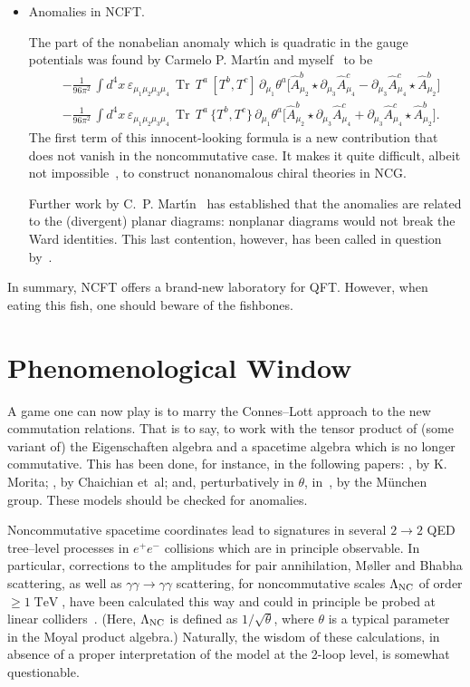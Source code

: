 \documentclass[a4paper,12pt]{article}
\newcommand{\Ahat}{\Hat{A}}
\newcommand{\del}{\partial}         %
\newcommand{\eps}{\varepsilon}      %
\newcommand{\ga}{\gamma}            %
\renewcommand{\Hat}[1]{\widehat{#1}}  %
\newcommand{\La}{\Lambda}           %
\DeclareMathOperator{\TeV}{TeV}     %
\DeclareMathOperator{\Tr}{Tr}       %
\newcommand{\1}{\mathbf{1}}         %
\newcommand{\7}{\dagger}            %
\newcommand{\8}{\bullet}            %
\renewcommand{\.}{\cdot}            %
\renewcommand{\:}{\colon}           %
\begin{document}
\begin{itemize}
\item  Anomalies in NCFT.

The part of the nonabelian anomaly which is quadratic in the gauge
potentials was found by Carmelo P. Mart\'{\i}n and
myself~\cite{Camilla} to be
\begin{align*}
&-\frac{1}{96\pi^2}\,\int d^4 x\,
\eps_{\mu_1\mu_2\mu_3\mu_4}\,\Tr\,T^a\,[T^b,T^c]\,
\del_{\mu_1} \theta^a \bigl[
\Ahat^b_{\mu_2} \star \del_{\mu_3} \Ahat^c_{\mu_4} -
\del_{\mu_3} \Ahat^c_{\mu_4} \star \Ahat^b_{\mu_2} \bigr]
\\
&-\frac{1}{96\pi^2}\,\int d^4 x\,
\eps_{\mu_1\mu_2\mu_3\mu_4}\,\Tr\,T^a\,\{T^b,T^c\}\,
\del_{\mu_1} \theta^a \bigl[
\Ahat^b_{\mu_2} \star \del_{\mu_3} \Ahat^c_{\mu_4} +
\del_{\mu_3} \Ahat^c_{\mu_4} \star \Ahat^b_{\mu_2} \bigr].
\end{align*}
The first term of this innocent-looking formula is a new contribution
that does not vanish in the noncommutative case. It makes it quite
difficult, albeit not impossible~\cite{IntriligatorK}, to construct
nonanomalous chiral theories in NCG.

Further work by C.~P. Mart\'{\i}n~\cite{MartinOrigin} has established
that the anomalies are related to the (divergent) planar diagrams:
nonplanar diagrams would not break the Ward identities. This last
contention, however, has been called in question by~\cite{ArmoniLT}.

\end{itemize}

In summary, NCFT offers a brand-new laboratory for QFT. However, when 
eating this fish, one should beware of the fishbones.



\section{Phenomenological Window}

A game one can now play is to marry the Connes--Lott approach to the
new commutation relations. That is to say, to work with the tensor
product of (some variant of) the Eigenschaften algebra and a spacetime
algebra which is no longer commutative. This has been done, for
instance, in the following papers: \cite{Morita}, by K. Morita;
\cite{ChaichianPJTModel}, by Chaichian et~al; and, perturbatively in
$\theta$, in~\cite{CalmetJSWW}, by the M\"unchen group. These models
should be checked for anomalies.

Noncommutative spacetime coordinates lead to signatures in several
$2 \to 2$ QED tree--level processes in $e^+e^-$ collisions which are
in principle observable. In particular, corrections to the amplitudes
for pair annihilation, M{\o}ller and Bhabha scattering, as well as
$\ga\ga \to \ga\ga$ scattering, for noncommutative scales
$\La_{\rm NC}$ of order $\geq 1 \TeV$, have been calculated this way
and could in principle be probed at linear colliders~\cite{Hewett}.
(Here, $\La_{\rm NC}$ is defined as $1/\sqrt{\theta}$, where $\theta$
is a typical parameter in the Moyal product algebra.) Naturally, the
wisdom of these calculations, in absence of a proper interpretation of
the model at the 2-loop level, is somewhat questionable.
\end{document}
